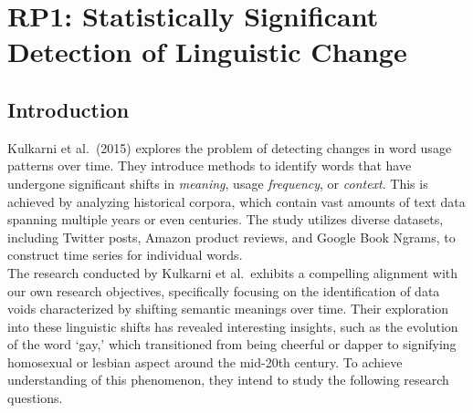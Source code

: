 
\section{RP1: Statistically Significant Detection of Linguistic Change} \label{sec:paper_kulkarni}
\subsection{Introduction} \label{subsec:kulkarni_introduction}

Kulkarni et al.\ (2015) explores the problem of detecting changes in word usage patterns over time.
They introduce methods to identify words that have undergone significant shifts in \emph{meaning}, usage \emph{frequency}, or \emph{context}.
This is achieved by analyzing historical corpora, which contain vast amounts of text data spanning multiple years or even centuries.
The study utilizes diverse datasets, including Twitter posts, Amazon product reviews, and Google Book Ngrams, to construct time series for individual words.\\
The research conducted by Kulkarni et al.\ exhibits a compelling alignment with our own research objectives,
specifically focusing on the identification of data voids characterized by shifting semantic meanings over time.
Their exploration into these linguistic shifts has revealed interesting insights, such as the evolution of the word `gay,'
which transitioned from being cheerful or dapper to signifying homosexual or lesbian aspect around the mid-20th century.
To achieve understanding of this phenomenon, they intend to study the following research questions.
